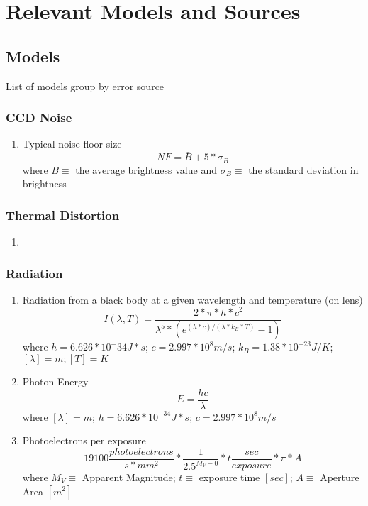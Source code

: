 \chapter{Relevant Models and Sources}
\section{Models}
List of models group by error source 

\subsection{CCD Noise}
\begin{enumerate}

    \item Typical noise floor size\cite{accuracy_performance_of_star_trackers} 
    \[ NF = \bar{B} + 5*\sigma_{B} \]
    where $\bar{B} \equiv$ the average brightness value and $\sigma_{B} \equiv$ the standard deviation in brightness


\end{enumerate}

\subsection{Thermal Distortion}
\begin{enumerate}
    \item 
\end{enumerate}

\subsection{Radiation}
\begin{enumerate}
    \item Radiation from a black body at a given wavelength and temperature (on lens)\cite{accuracy_performance_of_star_trackers}
    \[ I(\lambda,T) = \frac{2*\pi*h*c^2}{\lambda^5*(e^{(h*c)/(\lambda*k_B*T)}-1)} \]
    where $h = 6.626*10^-34 J*s$; $c = 2.997*10^8 m/s$; $k_B = 1.38 * 10^{-23} J/K$; $[\lambda] = m; [T] = K$

    \item Photon Energy \cite{accuracy_performance_of_star_trackers}
    \[ E = \frac{hc}{\lambda} \]
    where $[\lambda] = m$; $h = 6.626*10^{-34} J*s$; $c = 2.997*10^8 m/s$

    \item Photoelectrons per exposure \cite{accuracy_performance_of_star_trackers}
    \[ 19100\frac{photoelectrons}{s*mm^2} * \frac{1}{2.5^{M_V-0}} * t\frac{sec}{exposure} * \pi * A \]
    where $M_V \equiv$ Apparent Magnitude; $t \equiv$ exposure time $[sec]$; $A \equiv$ Aperture Area $[m^{2}]$

\end{enumerate}

